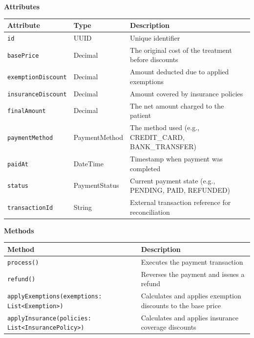 \documentclass[12pt, a4paper]{article}
\begin{document}
\textbf{Attributes}

\begin{center}
\small
\renewcommand{\arraystretch}{1.35}
\begin{tabularx}{\textwidth}{|>{\raggedright\arraybackslash}p{3.4cm}|>{\raggedright\arraybackslash}p{3.3cm}|Y|}
\hline
{}
\textbf{Attribute} & \textbf{Type} & \textbf{Description} \\ \hline
\texttt{id} & UUID & Unique identifier \\ \hline
\texttt{basePrice} & Decimal & The original cost of the treatment before discounts \\ \hline
\texttt{exemptionDiscount} & Decimal & Amount deducted due to applied exemptions \\ \hline
\texttt{insuranceDiscount} & Decimal & Amount covered by insurance policies \\ \hline
\texttt{finalAmount} & Decimal & The net amount charged to the patient \\ \hline
\texttt{paymentMethod} & PaymentMethod & The method used (e.g., CREDIT\_CARD, BANK\_TRANSFER) \\ \hline
\texttt{paidAt} & DateTime & Timestamp when payment was completed \\ \hline
\texttt{status} & PaymentStatus & Current payment state (e.g., PENDING, PAID, REFUNDED) \\ \hline
\texttt{transactionId} & String & External transaction reference for reconciliation \\ \hline
\end{tabularx}
\end{center}

\textbf{Methods}

\begin{center}
\small
\renewcommand{\arraystretch}{1.35}
\begin{tabularx}{\textwidth}{|M|Y|}
\hline
{}
\textbf{Method} & \textbf{Description} \\ \hline
\texttt{process()} & Executes the payment transaction \\ \hline
\texttt{refund()} & Reverses the payment and issues a refund \\ \hline
\texttt{applyExemptions(exemptions: List<Exemption>)} & Calculates and applies exemption discounts to the base price \\ \hline
\texttt{applyInsurance(policies: List<InsurancePolicy>)} & Calculates and applies insurance coverage discounts \\ \hline
\end{tabularx}
\end{center}
\end{document}
